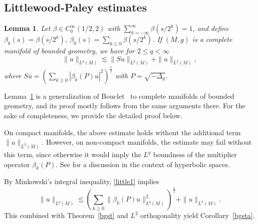 \documentclass[10pt]{amsart}
\newcommand{\newsection}[1]
{\subsection{#1}\setcounter{theorem}{0} \setcounter{equation}{0}
\par\noindent}
\newtheorem{lemma}[theorem]{Lemma}
\newcommand{\1}{{\bf 1}}
\begin{document}
\newsection{Littlewood-Paley estimates}


\begin{lemma}\label{littlewood}
    Let 
    $\beta\in C_0^\infty (1/2, 2)$ with $\sum_{k=-\infty}^\infty \beta(s/2^k)=1$, and define $\beta_k(s)=\beta(s/2^k)$, $\beta_0(s)= \sum_{k\le 0} \beta(s/2^k)$. If $(M,g)$ is a complete manifold of bounded geometry, we have for  $2\le q<\infty$
    \begin{equation}\label{little1}
        \|u\|_{L^q(M)}\lesssim \|Su\|_{L^q(M)} +\|u\|_{L^2(M)},
    \end{equation}
    where $Su=\left(\sum_{k\ge0} |\beta_k(P)u|^2\right)^{\frac12}$ with $P=\sqrt{-\Delta_g}$.
\end{lemma}
Lemma~\ref{littlewood} is a generalization of  Bouclet~\cite[Theorem 1.3]{Boulp} to complete manifolds of bounded geometry, and its proof mostly follows from the same arguments there. For the sake of completeness, we provide the detailed proof below.


On compact manifolds, the above estimate holds without the additional term $\|u\|_{L^2(M)}$. However, on non-compact manifolds,  the estimate may fail without this term, since otherwise it would imply the $L^q$ boundness of the multiplier operator $\beta_k(P)$. See \cite{AGL} for a discussion in the context of hyperbolic spaces.


By Minkowski's integral inequality, \eqref{little1} implies 
 \begin{equation}\label{litte1}
        \|u\|_{L^q(M)}\lesssim \left(\sum_{k\ge0}\|\beta_k(P)u\|^2_{L^q(M)}\right)^{\frac12} +\|u\|_{L^2(M)}.
    \end{equation}
This combined with Theorem~\ref{bgst} and $L^2$ orthogonality yield
Corollary~\ref{bgsta}.
\end{document}
